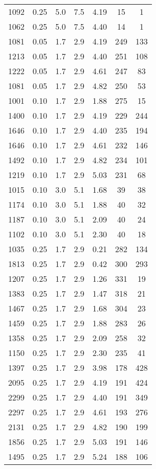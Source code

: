 \documentclass{aastex62}
\begin{document}
\begin{table}
\begin{tabular}{ccccccc}
1092 & 0.25 & 5.0 & 7.5 & 4.19 & 15 & 1 \\ 
1062 & 0.25 & 5.0 & 7.5 & 4.40 & 14 & 1 \\ 
1081 & 0.05 & 1.7 & 2.9 & 4.19 & 249 & 133 \\ 
1213 & 0.05 & 1.7 & 2.9 & 4.40 & 251 & 108 \\ 
1222 & 0.05 & 1.7 & 2.9 & 4.61 & 247 & 83 \\ 
1081 & 0.05 & 1.7 & 2.9 & 4.82 & 250 & 53 \\ 
1001 & 0.10 & 1.7 & 2.9 & 1.88 & 275 & 15 \\ 
1400 & 0.10 & 1.7 & 2.9 & 4.19 & 229 & 244 \\ 
1646 & 0.10 & 1.7 & 2.9 & 4.40 & 235 & 194 \\ 
1646 & 0.10 & 1.7 & 2.9 & 4.61 & 232 & 146 \\ 
1492 & 0.10 & 1.7 & 2.9 & 4.82 & 234 & 101 \\ 
1219 & 0.10 & 1.7 & 2.9 & 5.03 & 231 & 68 \\ 
1015 & 0.10 & 3.0 & 5.1 & 1.68 & 39 & 38 \\ 
1174 & 0.10 & 3.0 & 5.1 & 1.88 & 40 & 32 \\ 
1187 & 0.10 & 3.0 & 5.1 & 2.09 & 40 & 24 \\ 
1102 & 0.10 & 3.0 & 5.1 & 2.30 & 40 & 18 \\ 
1035 & 0.25 & 1.7 & 2.9 & 0.21 & 282 & 134 \\ 
1813 & 0.25 & 1.7 & 2.9 & 0.42 & 300 & 293 \\ 
1207 & 0.25 & 1.7 & 2.9 & 1.26 & 331 & 19 \\ 
1383 & 0.25 & 1.7 & 2.9 & 1.47 & 318 & 21 \\ 
1467 & 0.25 & 1.7 & 2.9 & 1.68 & 304 & 23 \\ 
1459 & 0.25 & 1.7 & 2.9 & 1.88 & 283 & 26 \\ 
1358 & 0.25 & 1.7 & 2.9 & 2.09 & 258 & 32 \\ 
1150 & 0.25 & 1.7 & 2.9 & 2.30 & 235 & 41 \\ 
1397 & 0.25 & 1.7 & 2.9 & 3.98 & 178 & 428 \\ 
2095 & 0.25 & 1.7 & 2.9 & 4.19 & 191 & 424 \\ 
2299 & 0.25 & 1.7 & 2.9 & 4.40 & 191 & 349 \\ 
2297 & 0.25 & 1.7 & 2.9 & 4.61 & 193 & 276 \\ 
2131 & 0.25 & 1.7 & 2.9 & 4.82 & 190 & 199 \\ 
1856 & 0.25 & 1.7 & 2.9 & 5.03 & 191 & 146 \\ 
1495 & 0.25 & 1.7 & 2.9 & 5.24 & 188 & 106 \\ 

\end{tabular}
\end{table}
\end{document}
